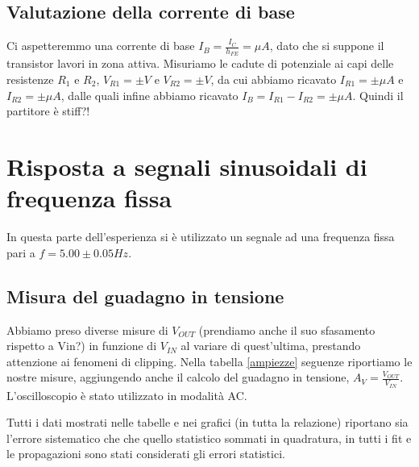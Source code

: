\documentclass[10pt,a4paper]{article}
\begin{document}
\subsection{Valutazione della corrente di base}
Ci aspetteremmo una corrente di base $I_B=\frac{I_C}{h_{FE}}= \mu A$, dato che si suppone il transistor lavori in zona attiva. Misuriamo le cadute di potenziale ai capi delle resistenze $R_1$ e $R_2$, $V_{R1}= \pm V$ e $V_{R2}= \pm V$, da cui abbiamo ricavato $I_{R1}= \pm \mu A$ e $I_{R2}= \pm \mu A$, dalle quali infine abbiamo ricavato $I_B=I_{R1}-I_{R2}= \pm \mu A$. Quindi il partitore è stiff?!

\section{Risposta a segnali sinusoidali di frequenza fissa}
In questa parte dell'esperienza si è utilizzato un segnale ad una frequenza fissa pari a $f= 5.00\pm0.05 Hz$.

\subsection{Misura del guadagno in tensione}
Abbiamo preso diverse misure di $V_{OUT}$ (prendiamo anche il suo sfasamento rispetto a Vin?) in funzione di $V_{IN}$ al variare di quest'ultima, prestando attenzione ai fenomeni di clipping. Nella tabella \ref{ampiezze} seguenze riportiamo le nostre misure, aggiungendo anche il calcolo del guadagno in tensione, $A_V=\frac{V_{OUT}}{V_{IN}}$.\\
L'oscilloscopio è stato utilizzato in modalità AC.

Tutti i dati mostrati nelle tabelle e nei grafici (in tutta la relazione) riportano sia l'errore sistematico che che quello statistico sommati in quadratura, in tutti i fit e le propagazioni sono stati considerati gli errori statistici.
\end{document}
